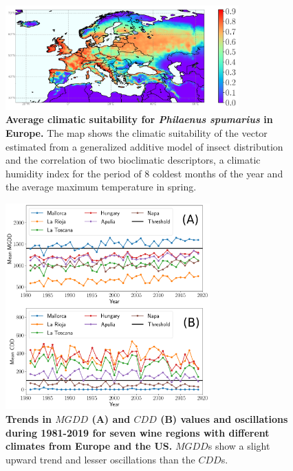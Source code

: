 \begin{figure}[H]
    \centering
    \includegraphics[width=0.8\textwidth]{Figures/vector_layer.png}
    \caption{\textbf{Average climatic suitability for \textit{Philaenus
                spumarius} in Europe.} The map shows the climatic suitability
        of the vector
        estimated from a generalized additive model of insect distribution and
        the
        correlation of two bioclimatic descriptors, a climatic humidity index
        for the
        period of 8 coldest months of the year and the average maximum
        temperature in
        spring.}
    \label{fig:sup_vector} %
\end{figure}

\begin{figure}[H]
    \centering

    \includegraphics[width=0.7\textwidth]{Figures/Mean_MGDD_CDD_sites.png}
    \caption{\textbf{Trends in $MGDD$ (A) and $CDD$ (B) values and
            oscillations during 1981-2019 for seven wine regions with different
            climates
            from Europe and the US.} $MGDD$s show a slight upward trend and
        lesser
        oscillations than the $CDD$s.}
    \label{fig:sup_climatic_oscilations} %
\end{figure}

